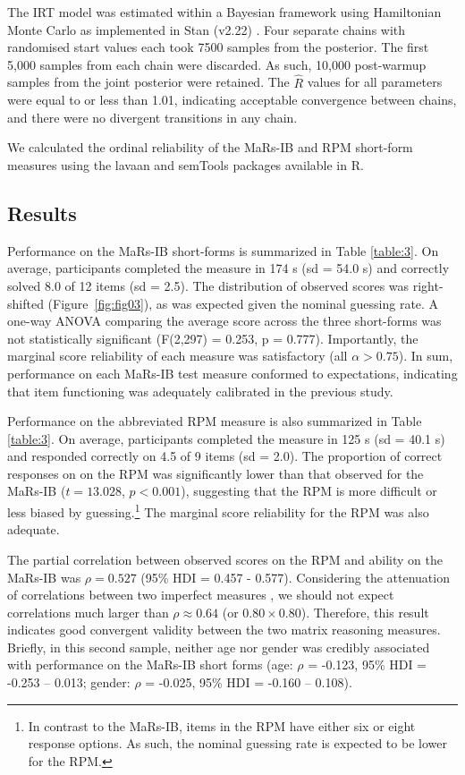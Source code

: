 \documentclass[a4paper,man,natbib]{apa6}
\begin{document}
The IRT model was estimated within a Bayesian framework using Hamiltonian Monte Carlo as implemented in Stan (v2.22) \citep{carpenter2017stan}. Four separate chains with randomised start values each took 7500 samples from the posterior. The first 5,000 samples from each chain were discarded. As such, 10,000 post-warmup samples from the joint posterior were retained. The $\hat{R}$ values for all parameters were equal to or less than 1.01, indicating acceptable convergence between chains, and there were no divergent transitions in any chain. 

We calculated the ordinal reliability of the MaRs-IB and RPM short-form measures using the lavaan \citep{lavaan} and semTools \citep{semtools} packages available in R.

\subsection{Results}

Performance on the MaRs-IB short-forms is summarized in Table \ref{table:3}. On average, participants completed the measure in 174 s (sd = 54.0 s) and correctly solved 8.0 of 12 items (sd = 2.5). The distribution of observed scores was right-shifted (Figure~\ref{fig:fig03}), as was expected given the nominal guessing rate. A one-way ANOVA comparing the average score across the three short-forms was not statistically significant (F(2,297) = 0.253, p = 0.777). Importantly, the marginal score reliability of each measure was satisfactory (all $\alpha > 0.75$). In sum, performance on each MaRs-IB test measure conformed to expectations, indicating that item functioning was adequately calibrated in the previous study.

Performance on the abbreviated RPM measure is also summarized in Table \ref{table:3}. On average, participants completed the measure in 125 s (sd = 40.1 s) and responded correctly on 4.5 of 9 items (sd = 2.0). The proportion of correct responses on on the RPM was significantly lower than that observed for the MaRs-IB ($t = 13.028$, $p < 0.001$), suggesting that the RPM is more difficult or less biased by guessing.\footnote{In contrast to the MaRs-IB, items in the RPM have either six or eight response options. As such, the nominal guessing rate is expected to be lower for the RPM.} The marginal score reliability for the RPM was also adequate.

The partial correlation between observed scores on the RPM and ability on the MaRs-IB was $\rho = 0.527$ (95\% HDI = 0.457 - 0.577). Considering the attenuation of correlations between two imperfect measures \citep{spearman1961proof}, we should not expect correlations much larger than $\rho \approx 0.64$ (or $0.80 \times 0.80$). Therefore, this result indicates good convergent validity between the two matrix reasoning measures. Briefly, in this second sample, neither age nor gender was credibly associated with performance on the MaRs-IB short forms (age: $\rho$ = -0.123, 95\% HDI = -0.253 -- 0.013; gender: $\rho$ = -0.025, 95\% HDI = -0.160 -- 0.108). 
\end{document}
